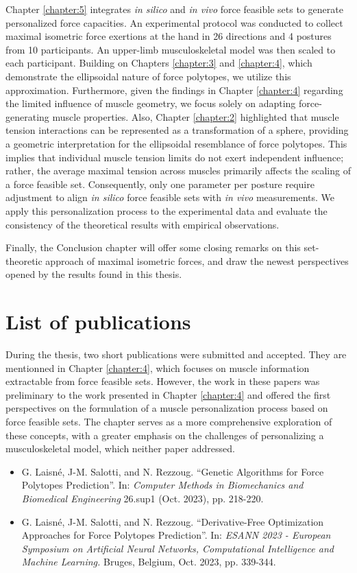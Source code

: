 Chapter \ref{chapter:5} integrates \emph{in silico} and \emph{in vivo} force feasible sets to generate personalized force capacities. An experimental protocol was conducted to collect maximal isometric force exertions at the hand in 26 directions and 4 postures from 10 participants. An upper-limb musculoskeletal model was then scaled to each participant. Building on Chapters \ref{chapter:3} and \ref{chapter:4}, which demonstrate the ellipsoidal nature of force polytopes, we utilize this approximation.  Furthermore, given the findings in Chapter \ref{chapter:4} regarding the limited influence of muscle geometry, we focus solely on adapting force-generating muscle properties. Also, Chapter \ref{chapter:2} highlighted that muscle tension interactions can be represented as a transformation of a sphere, providing a geometric interpretation for the ellipsoidal resemblance of force polytopes. This implies that individual muscle tension limits do not exert independent influence; rather, the average maximal tension across muscles primarily affects the scaling of a force feasible set. Consequently, only one parameter per posture require adjustment to align \emph{in silico} force feasible sets with \emph{in vivo} measurements. We apply this personalization process to the experimental data and evaluate the consistency of the theoretical results with empirical observations.

Finally, the Conclusion chapter will offer some closing remarks on this set-theoretic approach of maximal isometric forces, and draw the newest perspectives opened by the results found in this thesis. 

\section*{List of publications}
During the thesis, two short publications were submitted and accepted. They are mentionned in Chapter \ref{chapter:4}, which focuses on muscle information extractable from force feasible sets. However, the work in these papers was preliminary to the work presented in Chapter \ref{chapter:4} and offered the first perspectives on the formulation of a muscle personalization process based on force feasible sets. The chapter serves as a more comprehensive exploration of these concepts, with a greater emphasis on the challenges of personalizing a musculoskeletal model, which neither paper addressed.

\begin{itemize}
    \item {G. Laisné, J-M. Salotti, and N. Rezzoug. ``Genetic Algorithms for Force Polytopes Prediction''. In: \emph{Computer Methods in Biomechanics and Biomedical Engineering} 26.sup1 (Oct. 2023), pp. 218-220.}
    \item {G. Laisné, J-M. Salotti, and N. Rezzoug. ``Derivative-Free Optimization Approaches for Force Polytopes Prediction''. In: \emph{ESANN 2023 - European Symposium on Artificial Neural Networks, Computational Intelligence and Machine Learning.} Bruges, Belgium, Oct. 2023, pp. 339-344.}
\end{itemize}

